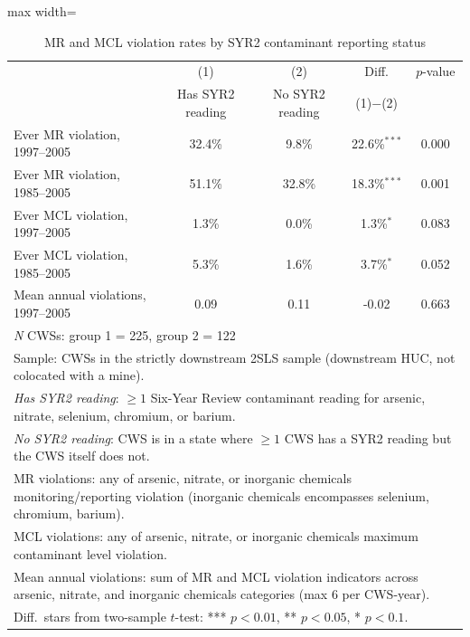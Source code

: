 \begin{table}[htbp]
\centering
\caption{MR and MCL violation rates by SYR2 contaminant reporting status}
\label{tab:syr2_mr_comparison}
\begin{adjustbox}{max width=\textwidth}
\begin{tabular}{lcccc}
\hline\hline
 & \multicolumn{1}{c}{(1)} & \multicolumn{1}{c}{(2)} & \multicolumn{1}{c}{Diff.} & \multicolumn{1}{c}{$p$-value} \\
 & Has SYR2 reading & No SYR2 reading & (1)$-$(2) & \\
\hline
Ever MR violation, 1997--2005 & 32.4\% & 9.8\% & 22.6\%$^{***}$ & 0.000 \\
Ever MR violation, 1985--2005 & 51.1\% & 32.8\% & 18.3\%$^{***}$ & 0.001 \\
Ever MCL violation, 1997--2005 & 1.3\% & 0.0\% & 1.3\%$^{*}$ & 0.083 \\
Ever MCL violation, 1985--2005 & 5.3\% & 1.6\% & 3.7\%$^{*}$ & 0.052 \\
Mean annual violations, 1997--2005 & 0.09 & 0.11 & -0.02$$ & 0.663 \\
\hline
\multicolumn{5}{l}{\textit{N} CWSs: group 1 = 225, group 2 = 122} \\
\multicolumn{5}{l}{\footnotesize Sample: CWSs in the strictly downstream 2SLS sample (downstream HUC, not colocated with a mine).} \\
\multicolumn{5}{l}{\footnotesize \textit{Has SYR2 reading}: $\geq 1$ Six-Year Review contaminant reading for arsenic, nitrate, selenium, chromium, or barium.} \\
\multicolumn{5}{l}{\footnotesize \textit{No SYR2 reading}: CWS is in a state where $\geq 1$ CWS has a SYR2 reading but the CWS itself does not.} \\
\multicolumn{5}{l}{\footnotesize MR violations: any of arsenic, nitrate, or inorganic chemicals monitoring/reporting violation (inorganic chemicals encompasses selenium, chromium, barium).} \\
\multicolumn{5}{l}{\footnotesize MCL violations: any of arsenic, nitrate, or inorganic chemicals maximum contaminant level violation.} \\
\multicolumn{5}{l}{\footnotesize Mean annual violations: sum of MR and MCL violation indicators across arsenic, nitrate, and inorganic chemicals categories (max 6 per CWS-year).} \\
\multicolumn{5}{l}{\footnotesize Diff.~stars from two-sample $t$-test: *** $p{<}0.01$, ** $p{<}0.05$, * $p{<}0.1$.} \\
\hline\hline
\end{tabular}
\end{adjustbox}
\end{table}

